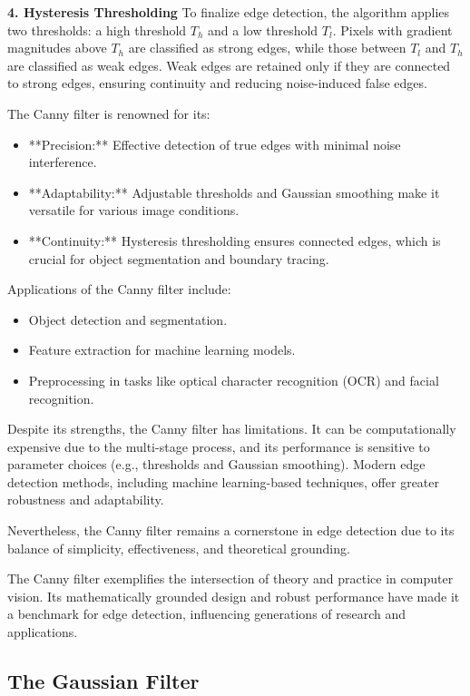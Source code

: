 \documentclass[11pt]{book}
\begin{document}
{\bf 4. Hysteresis Thresholding}
To finalize edge detection, the algorithm applies two thresholds: a high threshold $T_h$ and a low threshold $T_l$. Pixels with gradient magnitudes above $T_h$ are classified as strong edges, while those between $T_l$ and $T_h$ are classified as weak edges. Weak edges are retained only if they are connected to strong edges, ensuring continuity and reducing noise-induced false edges.


The Canny filter is renowned for its:
\begin{itemize}
    \item **Precision:** Effective detection of true edges with minimal noise interference.
    \item **Adaptability:** Adjustable thresholds and Gaussian smoothing make it versatile for various image conditions.
    \item **Continuity:** Hysteresis thresholding ensures connected edges, which is crucial for object segmentation and boundary tracing.
\end{itemize}

Applications of the Canny filter include:
\begin{itemize}
    \item Object detection and segmentation.
    \item Feature extraction for machine learning models.
    \item Preprocessing in tasks like optical character recognition (OCR) and facial recognition.
\end{itemize}

Despite its strengths, the Canny filter has limitations. It can be computationally expensive due to the multi-stage process, and its performance is sensitive to parameter choices (e.g., thresholds and Gaussian smoothing). Modern edge detection methods, including machine learning-based techniques, offer greater robustness and adaptability.

Nevertheless, the Canny filter remains a cornerstone in edge detection due to its balance of simplicity, effectiveness, and theoretical grounding.


The Canny filter exemplifies the intersection of theory and practice in computer vision. Its mathematically grounded design and robust performance have made it a benchmark for edge detection, influencing generations of research and applications.

\subsection{The Gaussian Filter}
\end{document}
